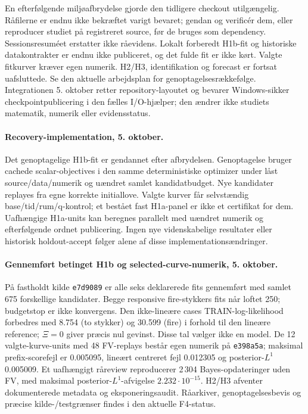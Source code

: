 En efterfølgende miljøafbrydelse gjorde den tidligere checkout utilgængelig.
Råfilerne er endnu ikke bekræftet varigt bevaret; gendan og verificér dem,
eller reproducer studiet på registreret source, før de bruges som dependency.
Sessionsresuméet erstatter ikke råevidens. Lokalt forberedt H1b-fit og
historiske datakontrakter er endnu ikke publiceret, og det fulde fit er
ikke kørt. Valgte fitkurver kræver egen numerik. H2/H3, identifikation og
forecast er fortsat uafsluttede. Se den aktuelle arbejdsplan for
genoptagelsesrækkefølge. Integrationen 5. oktober retter repository-layoutet
og bevarer Windows-sikker checkpointpublicering i den fælles I/O-hjælper;
den ændrer ikke studiets matematik, numerik eller evidensstatus.


\paragraph{Recovery-implementation, 5. oktober.}
Det genoptagelige H1b-fit er gendannet efter afbrydelsen. Genoptagelse bruger
cachede scalar-objectives i den samme deterministiske optimizer under låst
source/data/numerik og uændret samlet kandidatbudget. Nye kandidater replayes
fra egne korrekte initiallove. Valgte kurver får selvstændig base/tid/rum/q-kontrol;
et bestået fast H1a-panel er ikke et certifikat for dem. Uafhængige H1a-units
kan beregnes parallelt med uændret numerik og efterfølgende ordnet publicering.
Ingen nye videnskabelige resultater eller historisk holdout-accept følger alene
af disse implementationsændringer.

\paragraph{Gennemført betinget H1b og selected-curve-numerik, 5. oktober.}
På fastholdt kilde \texttt{e7d9089} er alle seks deklarerede fits gennemført
med samlet 675 forskellige kandidater. Begge responsive fire-stykkers fits
når loftet 250; budgetstop er ikke konvergens. Den ikke-lineære cases
TRAIN-log-likelihood forbedres med 8.754 (to stykker) og 30.599 (fire)
i forhold til den lineære reference; $\Xi=0$ giver præcis nul gevinst.
Disse tal vælger ikke en model. De 12 valgte-kurve-units med 48 FV-replays
består egen numerik på \texttt{e398a5a}; maksimal prefix-scorefejl er
0.005095, lineært centreret fejl 0.012305 og posterior-$L^1$ 0.005009.
Et uafhængigt råreview reproducerer 2\,304 Bayes-opdateringer uden FV,
med maksimal posterior-$L^1$-afvigelse $2.232\cdot10^{-15}$.
H2/H3 afventer dokumenterede metadata og eksponeringsaudit. Råarkiver,
genoptagelsesbevis og præcise kilde-/testgrænser findes i den aktuelle F4-status.

